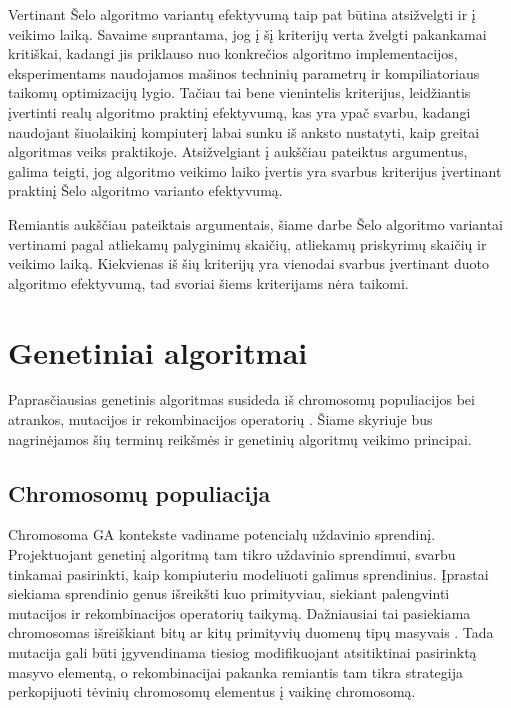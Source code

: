 \documentclass{VUMIFInfBakalaurinis}
\begin{document}
Vertinant Šelo algoritmo variantų efektyvumą taip pat būtina atsižvelgti ir į veikimo laiką.
Savaime suprantama, jog į šį kriterijų verta žvelgti pakankamai kritiškai, kadangi jis priklauso nuo konkrečios algoritmo implementacijos,
eksperimentams naudojamos mašinos techninių parametrų ir kompiliatoriaus taikomų optimizacijų lygio.
Tačiau tai bene vienintelis kriterijus, leidžiantis įvertinti realų algoritmo praktinį efektyvumą, kas yra ypač svarbu,
kadangi naudojant šiuolaikinį kompiuterį labai sunku iš anksto nustatyti, kaip greitai algoritmas veiks praktikoje.
Atsižvelgiant į aukščiau pateiktus argumentus, galima teigti, jog
algoritmo veikimo laiko įvertis yra svarbus kriterijus įvertinant praktinį Šelo algoritmo varianto efektyvumą.

Remiantis aukščiau pateiktais argumentais, šiame darbe Šelo algoritmo variantai vertinami pagal
atliekamų palyginimų skaičių, atliekamų priskyrimų skaičių ir veikimo laiką.
Kiekvienas iš šių kriterijų yra vienodai svarbus įvertinant duoto algoritmo efektyvumą, tad svoriai šiems kriterijams nėra taikomi.

\section{Genetiniai algoritmai}

Paprasčiausias genetinis algoritmas susideda iš chromosomų populiacijos bei atrankos, mutacijos ir rekombinacijos operatorių \cite{simpson1999faster}.
Šiame skyriuje bus nagrinėjamos šių terminų reikšmės ir genetinių algoritmų veikimo principai.

\subsection{Chromosomų populiacija}

Chromosoma GA kontekste vadiname potencialų uždavinio sprendinį.
Projektuojant genetinį algoritmą tam tikro uždavinio sprendimui, svarbu tinkamai pasirinkti,
kaip kompiuteriu modeliuoti galimus sprendinius.
Įprastai siekiama sprendinio genus išreikšti kuo primityviau, siekiant
palengvinti mutacijos ir rekombinacijos operatorių taikymą.
Dažniausiai tai pasiekiama chromosomas išreiškiant bitų ar kitų primityvių duomenų tipų masyvais \cite{whitley1994genetic}.
Tada mutacija gali būti įgyvendinama tiesiog modifikuojant atsitiktinai pasirinktą masyvo elementą,
o rekombinacijai pakanka remiantis tam tikra strategija perkopijuoti tėvinių chromosomų elementus į vaikinę chromosomą.
\end{document}
